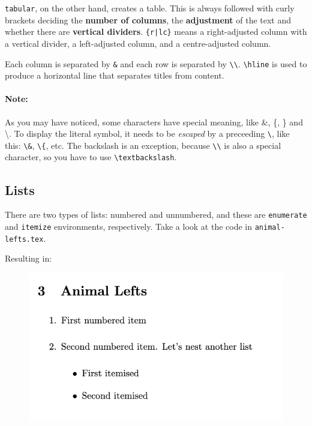 \verb|tabular|, on the other hand, creates a table. This is always followed with curly brackets deciding the \textbf{number of columns}, the \textbf{adjustment} of the text and whether there are \textbf{vertical dividers}.
\verb!{r|lc}! means a right-adjusted column with a vertical divider, a left-adjusted column, and a centre-adjusted column.

Each column is separated by \verb|&| and each row is separated by \verb|\\|. \verb|\hline| is used to produce a horizontal line that separates titles from content.
\paragraph{Note:} As you may have noticed, some characters have special meaning, like \&, \{, \} and \textbackslash. To display the literal symbol, it needs to be \emph{escaped} by a preceeding \verb|\|, like this: \verb|\&|, \verb|\{|, etc. The backslash is an exception, because \verb|\\| is also a special character, so you have to use \verb|\textbackslash|.

\subsection{Lists}
There are two types of lists: numbered and unnumbered, and these are \verb|enumerate| and \verb|itemize| environments, respectively.
Take a look at the code in \verb|animal-lefts.tex|.



Resulting in:

\begin{figure}[h]
    \centering
        \includegraphics[scale=0.8]{figures/list.png}
    \label{fig:list}
\end{figure}

